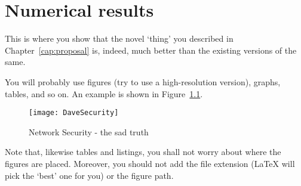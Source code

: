 
\chapter{Numerical results}

This is where you show that the novel `thing' you described in Chapter~\ref{cap:proposal} is, indeed, much better than the existing versions of the same.

You will probably use figures (try to use a high-resolution version), graphs, tables, and so on. An example is shown in Figure~\ref{fig:dave}.

\begin{figure}[htbp]
\begin{center}
\texttt{[image: DaveSecurity]}
\caption{Network Security - the sad truth}
\label{fig:dave}
\end{center}
\end{figure}

Note that, likewise tables and listings, you shall not worry about where the figures are placed. Moreover, you should not add the file extension (LaTeX will pick the `best' one for you) or the figure path.
